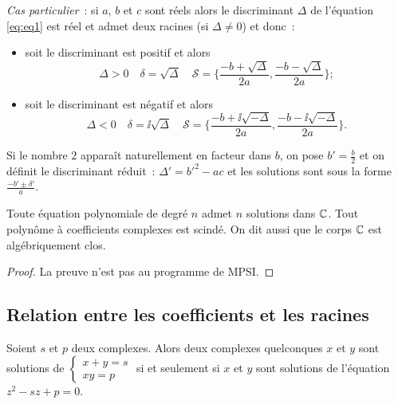 \emph{Cas particulier}~: si \(a\), \(b\) et \(c\) sont réels alors le 
discriminant \(\Delta\) de l'équation \eqref{eq:eq1} est réel et admet deux 
racines (si \(\Delta \neq 0\)) et donc~:
\begin{itemize}
    \item soit le discriminant est positif et alors
    \begin{equation}
        \Delta >0 \quad \delta = \sqrt{\Delta} \quad \mathcal{S} = \biggl\lbrace 
            \frac{-b + \sqrt{\Delta}}{2a} , \frac{-b-\sqrt{\Delta}}{2a} 
            \biggl\rbrace;
        \end{equation}
    \item soit le discriminant est négatif et alors
    \begin{equation}
        \Delta <0 \quad \delta = \ii\sqrt{\Delta} \quad \mathcal{S} = 
        \biggl\lbrace \frac{-b + \ii\sqrt{-\Delta}}{2a} , 
            \frac{-b-\ii\sqrt{-\Delta}}{2a} \biggl\rbrace.
        \end{equation}
\end{itemize}

Si le nombre \(2\) apparaît naturellement en facteur dans \(b\), on pose 
\(b' = \frac{b}{2}\) et on définit le discriminant réduit~: \(\Delta' = b'^2-ac\) et 
les solutions sont sous la forme \(\frac{-b'\pm \delta'}{a}\).

\begin{theo}
    Toute équation polynomiale de degré \(n\) admet \(n\) solutions dans \(\mathbb{C}\). 
    Tout polynôme à coefficients complexes est scindé. On dit aussi que le corps 
    \(\mathbb{C}\) est algébriquement clos.
\end{theo}

\begin{proof}
    La preuve n'est pas au programme de MPSI.
\end{proof}

\subsection{Relation entre les coefficients et les racines}
\label{subsec:relationcoefsracines}

\begin{prop}
    Soient \(s\) et \(p\) deux complexes. Alors deux complexes quelconques \(x\) 
    et \(y\) sont solutions de \(\begin{cases} x  + y = s \\ xy = p \end{cases}\) si 
    et seulement si \(x\) et \(y\) sont solutions de l'équation \(z^2 -sz + p = 0\).
\end{prop}

